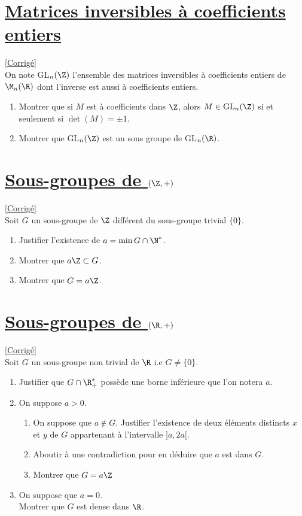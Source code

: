 \documentclass[8pt]{book}
\begin{document}
	\section{\underline{Matrices inversibles à coefficients entiers} }
	\label{Matrices inversibles à coefficients entiers}
	\textcolor{blue}{\hyperref[Matrices inversibles à coefficients entiers corrigé]{[Corrigé]}}\\
	On note GL$_n(\Z)$ l'ensemble des matrices inversibles à coefficients entiers de $\M_n(\R)$ dont l'inverse est aussi à coefficients entiers.
	\begin{enumerate}
		\item Montrer que si $M$ est à coefficients dans $\Z$, alors $M\in \text{GL}_n(\Z)$ si et seulement si $\det(M)=\pm1$.
		\item Montrer que GL$_n(\Z)$ est un sous groupe de GL$_n(\R)$.
	\end{enumerate}
	
	\section{\underline{Sous-groupes de $(\Z,+)$} }
	\label{Sous-groupes de (Z,+)}
	\textcolor{blue}{\hyperref[Sous-groupes de Z corrigé]{[Corrigé]}}\\
	Soit $G$ un sous-groupe de $\Z$ différent du sous-groupe trivial $\{0\}$.
	\begin{enumerate}
		\item Justifier l'existence de $a=\min G\cap \N^*$.
		\item Montrer que $a\Z\subset G$.
		\item Montrer que $G=a\Z$.
	\end{enumerate}
	
	\section{\underline{Sous-groupes de $(\R,+)$} }
	\label{Sous-groupes de (R,+)}
	\textcolor{blue}{\hyperref[Sous-groupes de R corrigé]{[Corrigé]}}\\
	Soit $G$ un sous-groupe non trivial de $\R$ i.e $G\ne \{0\}$.
	\begin{enumerate}
		\item Justifier que $G\cap \R^*_+$ possède une borne inférieure que l'on notera $a$.
		\item On suppose $a>0$.
		\begin{enumerate}[label=\alph*.]
			\item On suppose que $a\notin G$. Justifier l'existence de deux éléments distincts $x$ et $y$ de $G$ appartenant à l'intervalle $]a,2a[$.
			\item Aboutir à une contradiction pour en déduire que $a$ est dans $G$.
			\item Montrer que $G=a\Z$
		\end{enumerate}
		\item On suppose que $a=0$.\\
		Montrer que $G$ est dense dans $\R$.
	\end{enumerate}
	
\end{document}

